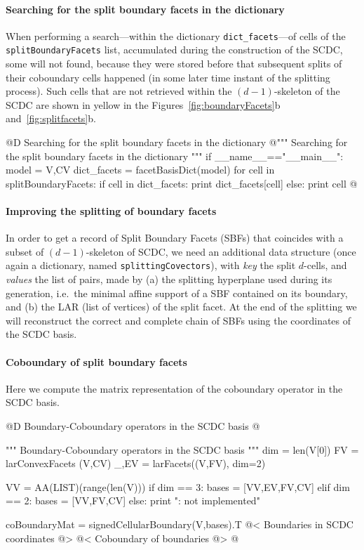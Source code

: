\documentclass[11pt,oneside]{article}	%
\begin{document}
\paragraph{Searching for the split boundary facets in the dictionary}
When performing a search---within the dictionary \texttt{dict\_facets}---of cells of the  \texttt{splitBoundaryFacets} list, accumulated during the construction of the SCDC, some
will not found, because they were stored before that subsequent splits of their coboundary cells
happened (in some later time instant of the splitting process). Such cells that are not retrieved within the $(d-1)$-skeleton of the SCDC are shown in yellow in the Figures~\ref{fig:boundaryFacets}b and~\ref{fig:splitfacets}b.

@D Searching for the split boundary facets in the dictionary
@{""" Searching for the split boundary facets in the dictionary """
if __name__=="__main__":
	model = V,CV
	dict_facets = facetBasisDict(model)
	for cell in splitBoundaryFacets: 
		if cell in dict_facets:
			print dict_facets[cell]
		else: print cell
@}

\paragraph{Improving the splitting of boundary facets}
In order to get a record of Split Boundary Facets (SBFs) that coincides with a subset of $(d-1)$-skeleton of SCDC, we need an additional data structure (once again a dictionary, named \texttt{splittingCovectors}), with \emph{key} the split $d$-cells, and \emph{values} the list of pairs, made by (a) the splitting hyperplane used during its generation, i.e.~the minimal affine support of a SBF contained on its boundary, and (b) the LAR (list of vertices) of the split facet. At the end of the splitting we will reconstruct the correct and complete chain of SBFs using the coordinates of the SCDC basis.




\paragraph{Coboundary of split boundary facets}

Here we compute the matrix representation of the coboundary operator in the SCDC basis.

@D Boundary-Coboundary operators in the SCDC basis
@{""" Boundary-Coboundary operators in the SCDC basis """
dim = len(V[0])
FV = larConvexFacets (V,CV)
_,EV = larFacets((V,FV), dim=2)

VV = AA(LIST)(range(len(V)))
if dim == 3: bases = [VV,EV,FV,CV]
elif dim == 2: bases = [VV,FV,CV]
else: print "\nerror: not implemented\n"

coBoundaryMat = signedCellularBoundary(V,bases).T
@< Boundaries in SCDC coordinates @>
@< Coboundary of boundaries @>
@}
\end{document}
